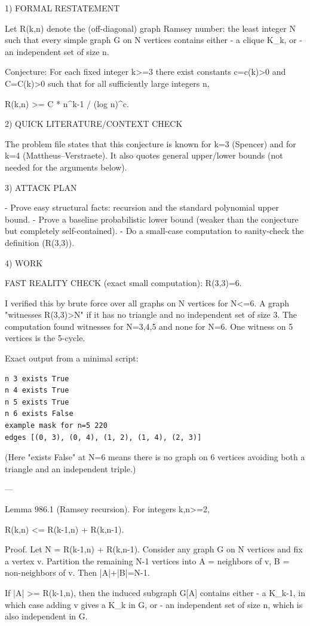 
1) FORMAL RESTATEMENT

Let R(k,n) denote the (off-diagonal) graph Ramsey number: the least integer N such that
every simple graph G on N vertices contains either
- a clique K_k, or
- an independent set of size n.

Conjecture:
For each fixed integer k>=3 there exist constants c=c(k)>0 and C=C(k)>0 such that for all
sufficiently large integers n,

  R(k,n) >= C * n^{k-1} / (log n)^c.

2) QUICK LITERATURE/CONTEXT CHECK

The problem file states that this conjecture is known for k=3 (Spencer) and for k=4
(Mattheus--Verstraete). It also quotes general upper/lower bounds (not needed for the
arguments below).

3) ATTACK PLAN

- Prove easy structural facts: recursion and the standard polynomial upper bound.
- Prove a baseline probabilistic lower bound (weaker than the conjecture but completely
  self-contained).
- Do a small-case computation to sanity-check the definition (R(3,3)).

4) WORK

FAST REALITY CHECK (exact small computation): R(3,3)=6.

I verified this by brute force over all graphs on N vertices for N<=6.
A graph "witnesses R(3,3)>N" if it has no triangle and no independent set of size 3.
The computation found witnesses for N=3,4,5 and none for N=6.
One witness on 5 vertices is the 5-cycle.

Exact output from a minimal script:
\begin{verbatim}
n 3 exists True
n 4 exists True
n 5 exists True
n 6 exists False
example mask for n=5 220
edges [(0, 3), (0, 4), (1, 2), (1, 4), (2, 3)]
\end{verbatim}

(Here "exists False" at N=6 means there is no graph on 6 vertices avoiding both a triangle
and an independent triple.)

---

Lemma 986.1 (Ramsey recursion).
For integers k,n>=2,

  R(k,n) <= R(k-1,n) + R(k,n-1).

Proof.
Let N = R(k-1,n) + R(k,n-1). Consider any graph G on N vertices and fix a vertex v.
Partition the remaining N-1 vertices into
  A = neighbors of v,
  B = non-neighbors of v.
Then |A|+|B|=N-1.

If |A| >= R(k-1,n), then the induced subgraph G[A] contains either
- a K_{k-1}, in which case adding v gives a K_k in G, or
- an independent set of size n, which is also independent in G.

